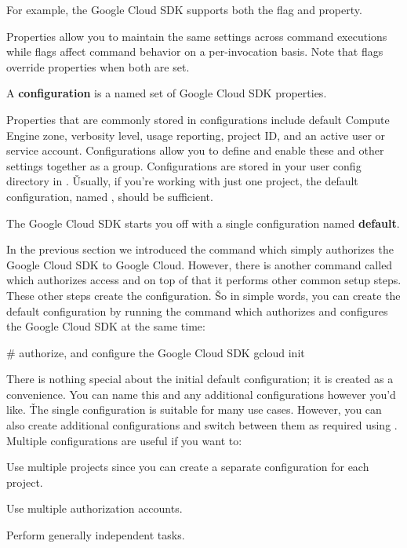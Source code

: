 \be
For example, the Google Cloud SDK supports both the  flag and  property.
\ee

Properties allow you to maintain the same settings across command executions while flags affect command behavior on a
per-invocation basis. Note that flags override properties when both are set.

\bd[Configuration]
A \textbf{configuration} is a named set of Google Cloud SDK properties.
\ed

Properties that are commonly stored in configurations include default Compute Engine zone, verbosity level, usage
reporting, project ID, and an active user or service account. Configurations allow you to define and enable these and
other settings together as a group. Configurations are stored in your user config directory in . \v

Usually, if you're working with just one project, the default configuration, named , should be sufficient.

The Google Cloud SDK starts you off with a single configuration named \textbf{default}.
\ed

In the previous section we introduced the command  which simply authorizes the Google Cloud
SDK to Google Cloud. However, there is another command called  which authorizes access and on top
of that it performs other common setup steps. These other steps create the configuration. \v

So in simple words, you can create the default configuration by running the  command which
authorizes and configures the Google Cloud SDK at the same time:
\begin{bash}
# authorize, and configure the Google Cloud SDK
gcloud init
\end{bash}

There is nothing special about the initial default configuration; it is created as a convenience. You can name this
and any additional configurations however you'd like. \v

The single  configuration is suitable for many use cases. However, you can also create additional
configurations and switch between them as required using . Multiple
configurations are useful if you want to:
\bit
\item Use multiple projects since you can create a separate configuration for each project.
\item Use multiple authorization accounts.
\item Perform generally independent tasks.
\eit

